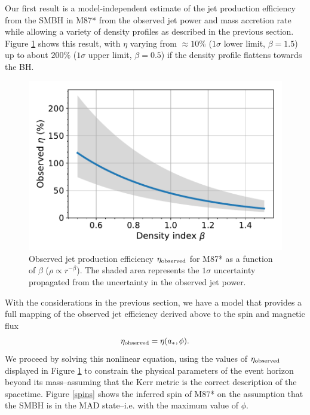 \documentclass[twocolumn, linenumbers]{aastex62} %
\begin{document}
Our first result is a model-independent estimate of the jet production efficiency from the SMBH in M87* from the observed jet power and mass accretion rate while allowing a variety of density profiles as described in the previous section. Figure \ref{obs-eta} shows this result, with $\eta$ varying from $\approx 10\%$ ($1\sigma$ lower limit, $\beta=1.5$) up to about $200\%$ ($1\sigma$ upper limit, $\beta=0.5$) if the density profile flattens towards the BH.

\begin{figure}[h]
\centering
\includegraphics[width=\linewidth]{figures/observed-eta.pdf}
\caption{Observed jet production efficiency $\eta_{\rm observed}$ for M87* as a function of $\beta$ ($\rho \propto r^{-\beta}$). The shaded area represents the $1\sigma$ uncertainty propagated from the uncertainty in the observed jet power. }
\label{obs-eta}
\end{figure}

With the considerations in the previous section, we have a model that provides a full mapping of the observed jet efficiency derived above to the spin and magnetic flux 
\begin{equation}    \label{eq}
\eta_{\rm observed}=\eta(a_*, \phi).
\end{equation}
We proceed by solving this nonlinear equation, using the values of $\eta_{\rm observed}$ displayed in Figure \ref{obs-eta} to constrain the physical parameters of the event horizon beyond its mass--assuming that the Kerr metric is the correct description of the spacetime. Figure \ref{spins} shows the inferred spin of M87* on the assumption that the SMBH is in the MAD state--i.e. with the maximum value of $\phi$. 
\end{document}
